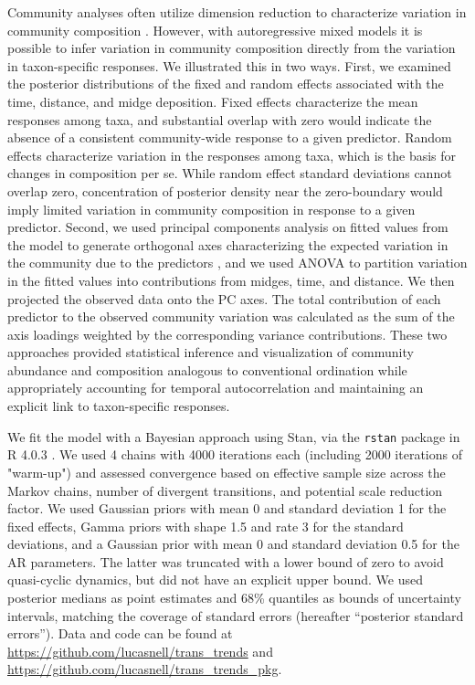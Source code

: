 Community analyses often utilize dimension reduction to characterize 
variation in community composition \citep{Mcgarigal2013}.
However, with autoregressive mixed models it is possible to infer variation in community composition 
directly from the variation in taxon-specific responses.
We illustrated this in two ways.
First, we examined the posterior distributions of the fixed and random effects 
associated with the time, distance, and midge deposition. 
Fixed effects characterize the mean responses among taxa, 
and substantial overlap with zero would indicate the absence of a consistent community-wide 
response to a given predictor.
Random effects characterize variation in the responses among taxa,
which is the basis for changes in composition per se. 
While random effect standard deviations cannot overlap zero,
concentration of posterior density near the zero-boundary 
would imply limited variation in community composition in response to a given predictor.
Second, we used principal components analysis on fitted values from the model
to generate orthogonal axes
characterizing the expected variation in the community due to the predictors
\citep[similar to][]{Jackson2012},
and we used ANOVA to partition variation in the fitted values 
into contributions from midges, time, and distance. 
We then projected the observed data onto the PC axes.
The total contribution of each predictor to the observed community variation
was calculated as the sum of the axis loadings weighted by 
the corresponding variance contributions.
These two approaches provided statistical inference and visualization 
of community abundance and composition analogous to conventional ordination 
while appropriately accounting for temporal autocorrelation 
and maintaining an explicit link to taxon-specific responses. 



We fit the model with a Bayesian approach using Stan,
via the \texttt{rstan} \citep{Stan2018} package in R 4.0.3 \citep{R2020}.
We used 4 chains with 4000 iterations each (including 2000 iterations of "warm-up")
and assessed convergence based on effective sample size across the Markov chains, number of divergent
transitions, and potential scale reduction factor.
We used Gaussian priors with mean 0 and standard deviation 1 for the fixed effects,
Gamma priors with shape 1.5 and rate 3 for the standard deviations,
and a Gaussian prior with mean 0 and standard deviation 0.5 for the AR parameters.
The latter was truncated with a lower bound of zero to avoid quasi-cyclic dynamics,
but did not have an explicit upper bound. 
We used posterior medians as point estimates and 68\% quantiles as bounds of uncertainty intervals,
matching the coverage of standard errors (hereafter ``posterior standard errors'').
Data and code can be found at \url{https://github.com/lucasnell/trans\_trends}
and \url{https://github.com/lucasnell/trans\_trends\_pkg}.